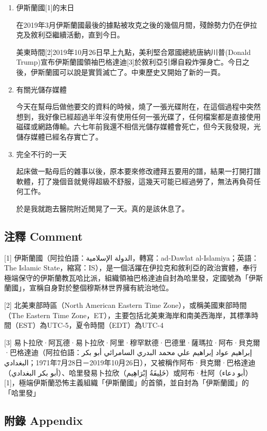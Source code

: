 \documentclass[
]{article}
\begin{document}
\begin{enumerate}
\def\labelenumi{\arabic{enumi}.}
\item
  伊斯蘭國{[}1{]}的末日

  在2019年3月伊斯蘭國最後的據點被攻克之後的幾個月間，殘餘勢力仍在伊拉克及敘利亞繼續活動，直到今日。

  美東時間{[}2{]}2019年10月26日早上九點，美利堅合眾國總統唐納川普(Donald
  Trump)宣布伊斯蘭國領袖巴格達迪{[}3{]}於敘利亞引爆自殺炸彈身亡。今日之後，伊斯蘭國可以說是實質滅亡了。中東歷史又開始了新的一頁。
\item
  有關光儲存媒體

  今天在幫母后做他要交的資料的時候，燒了一張光碟附在，在這個過程中突然想到，我好像已經超過半年沒有使用任何一張光碟了，任何檔案都是直接使用磁碟或網路傳輸。六七年前我還不相信光儲存媒體會死亡，但今天我發現，光儲存媒體已經名存實亡了。
\item
  完全不行的一天

  起床做一點母后的雜事以後，原本要來修改禮拜五要用的譜，結果一打開打譜軟體，打了幾個音就覺得超級不舒服，這幾天可能已經過勞了，無法再負荷任何工作。

  於是我就跑去醫院附近閒晃了一天。真的是該休息了。
\end{enumerate}

\hypertarget{ux6ce8ux91cb-comment-22}{%
\subsection{注釋 Comment}\label{ux6ce8ux91cb-comment-22}}

{[}1{]} 伊斯蘭國（阿拉伯語：الدولة الإسلامية‎，轉寫：ad-Dawlat
al-Islamiya；英語：The Islamic
State，縮寫：IS），是一個活躍在伊拉克和敘利亞的政治實體，奉行極端保守的伊斯蘭教瓦哈比派，組織領袖巴格達迪自封為哈里發，定國號為「伊斯蘭國」，宣稱自身對於整個穆斯林世界擁有統治地位。

{[}2{]} 北美東部時區（North American Eastern Time
Zone），或稱美國東部時間（The Eastern Time
Zone，ET），主要包括北美東海岸和南美西海岸，其標準時間（EST）為UTC-5，夏令時間（EDT）為UTC-4

{[}3{]}
易卜拉欣·阿瓦德·易卜拉欣·阿里·穆罕默德·巴德里·薩瑪拉·阿布·貝克爾·巴格達迪（阿拉伯語：إبراهيم
عواد إبراهيم علي محمد البدري السامرائي أبو بكر
البغدادي‎；1971年7月28日－2019年10月26日），又被稱作阿布·貝克爾·巴格達迪（أبو
بكر البغدادي‎）、哈里發易卜拉欣（خَلِيفَةُ
إِبْرَاهِيم‎）或阿布·杜阿（أبو
دعاء‎）{[}1{]}，極端伊斯蘭恐怖主義組織「伊斯蘭國」的首領，並自封為「伊斯蘭國」的「哈里發」

\hypertarget{ux9644ux9304-appendix-21}{%
\subsection{附錄 Appendix}\label{ux9644ux9304-appendix-21}}
\end{document}
